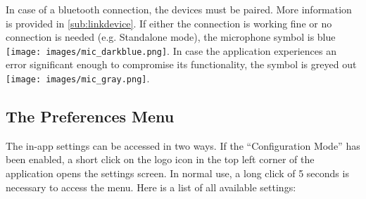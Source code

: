 \documentclass[11pt,a4paper,titlepage]{article}
\begin{document}
In case of a bluetooth connection, the devices must be paired. More information is provided in \ref{sub:linkdevice}. If either the connection is working fine or no connection is needed (e.g. Standalone mode), the microphone symbol is blue \texttt{[image: images/mic\_darkblue.png]}. In case the application experiences an error significant enough to compromise its functionality, the symbol is greyed out \texttt{[image: images/mic\_gray.png]}.




\subsection{The Preferences Menu}\label{sub:preferences}

The in-app settings can be accessed in two ways. If the ``Configuration Mode'' has been enabled, a short click on the logo icon in the top left corner of the application opens the settings screen. In normal use, a long click of 5 seconds is necessary to access the menu. Here is a list of all available settings:
\end{document}
